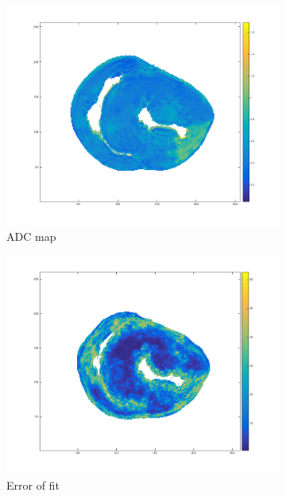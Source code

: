 \begin{figure}
    \begin{subfigure}{.31\textwidth}
        \includegraphics[width=\textwidth]{figures/pig5_adc_22}
        \caption{ADC map}
        \label{fig:pig5_adc}
    \end{subfigure}
    \begin{subfigure}{.31\textwidth}
        \includegraphics[width=\textwidth]{figures/pig5_err_22}
        \caption{Error of fit}
        \label{fig:pig5_err}
    \end{subfigure}
    \begin{subfigure}{.31\textwidth}

\end{subfigure}
\end{figure}
